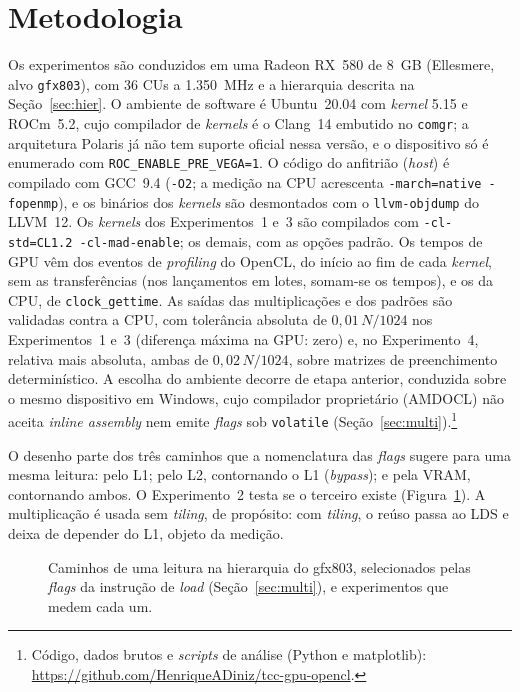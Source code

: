\documentclass[12pt]{article}
\begin{document}
\section{Metodologia}
\label{sec:metodologia-ambiente}

Os experimentos são conduzidos em uma Radeon RX~580 de 8~GB (Ellesmere, alvo
\texttt{gfx803}), com 36 CUs a 1.350~MHz e a hierarquia descrita na Seção~\ref{sec:hier}. O
ambiente de software é Ubuntu~20.04 com \textit{kernel} 5.15 e ROCm~5.2, cujo
compilador de \textit{kernels} é o Clang~14 embutido no \texttt{comgr}; a
arquitetura Polaris já não tem suporte oficial nessa versão, e o dispositivo só é
enumerado com \texttt{ROC\_ENABLE\_PRE\_VEGA=1}. O código
do anfitrião (\textit{host}) é compilado com GCC~9.4 (\texttt{-O2}; a medição na CPU
acrescenta \texttt{-march=native -fopenmp}), e os binários dos \textit{kernels} são
desmontados com o \texttt{llvm-objdump} do LLVM~12. Os \textit{kernels} dos
Experimentos~1 e~3 são compilados com \texttt{-cl-std=CL1.2 -cl-mad-enable}; os
demais, com as opções padrão. Os tempos de GPU vêm dos eventos de
\textit{profiling} do OpenCL, do início ao fim de cada \textit{kernel}, sem as
transferências (nos lançamentos em lotes, somam-se os tempos), e os da CPU, de
\texttt{clock\_gettime}. As saídas das multiplicações e dos padrões são
validadas contra a CPU, com tolerância absoluta de $0{,}01\,N/1024$ nos
Experimentos~1 e~3 (diferença máxima na GPU: zero) e, no Experimento~4, relativa mais absoluta, ambas de
$0{,}02\,N/1024$, sobre matrizes de preenchimento determinístico. A escolha do ambiente decorre de etapa
anterior, conduzida sobre o mesmo dispositivo em Windows, cujo compilador
proprietário (AMDOCL) não aceita \textit{inline assembly} nem emite \textit{flags}
sob \texttt{volatile} (Seção~\ref{sec:multi}).\footnote{Código, dados brutos e
\textit{scripts} de análise (Python e matplotlib):
\url{https://github.com/HenriqueADiniz/tcc-gpu-opencl}.}

O desenho parte dos três caminhos que a nomenclatura das \textit{flags} sugere
para uma mesma leitura: pelo L1; pelo L2, contornando o L1 (\textit{bypass}); e
pela VRAM, contornando ambos. O Experimento~2 testa se o terceiro existe (Figura~\ref{fig:hierarquia}). A
multiplicação é usada sem \textit{tiling}, de propósito: com \textit{tiling}, o
reúso passa ao LDS e deixa de depender do L1, objeto da medição.

\begin{figure}[ht]
\centering

\caption{Caminhos de uma leitura na hierarquia do gfx803, selecionados pelas
\textit{flags} da instrução de \textit{load} (Seção~\ref{sec:multi}), e
experimentos que medem cada um.}
\label{fig:hierarquia}
\end{figure}
\end{document}
